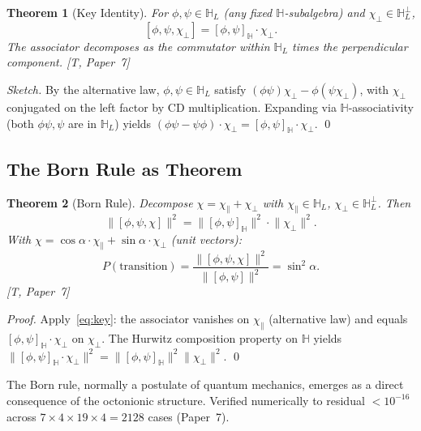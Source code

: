 \documentclass[11pt, a4paper]{article}
\newtheorem{theorem}{Theorem}
\newcommand{\Hq}{\mathbb{H}}
\newcommand{\norm}[1]{\lVert #1 \rVert}
\begin{document}
\begin{theorem}[Key Identity]
\label{thm:key_identity}
For $\phi, \psi \in \Hq_L$ (any fixed $\Hq$-subalgebra) and
$\chi_\perp \in \Hq_L^\perp$,
\begin{equation}
\boxed{\;[\phi, \psi, \chi_\perp] = [\phi, \psi]_\Hq \cdot \chi_\perp.\;}
\label{eq:key}
\end{equation}
The associator decomposes as the commutator within $\Hq_L$ times the
perpendicular component. [T, Paper~7]
\end{theorem}

\begin{proof}[Sketch]
By the alternative law, $\phi, \psi \in \Hq_L$ satisfy
$(\phi \psi) \chi_\perp - \phi(\psi \chi_\perp)$, with $\chi_\perp$
conjugated on the left factor by CD multiplication. Expanding via
$\Hq$-associativity (both $\phi\psi, \psi$ are in $\Hq_L$) yields
$(\phi\psi - \psi\phi) \cdot \chi_\perp = [\phi, \psi]_\Hq \cdot \chi_\perp$.
\qed
\end{proof}

\subsection{The Born Rule as Theorem}

\begin{theorem}[Born Rule]
\label{thm:born}
Decompose $\chi = \chi_\parallel + \chi_\perp$ with
$\chi_\parallel \in \Hq_L$, $\chi_\perp \in \Hq_L^\perp$. Then
\begin{equation}
\norm{[\phi, \psi, \chi]}^2 = \norm{[\phi, \psi]_\Hq}^2 \cdot \norm{\chi_\perp}^2.
\end{equation}
With $\chi = \cos\alpha \cdot \chi_\parallel + \sin\alpha \cdot \chi_\perp$
(unit vectors):
\begin{equation}
P(\text{transition}) = \frac{\norm{[\phi,\psi,\chi]}^2}{\norm{[\phi,\psi]}^2}
= \sin^2\alpha.
\end{equation}
[T, Paper~7]
\end{theorem}

\begin{proof}
Apply~\eqref{eq:key}: the associator vanishes on $\chi_\parallel$
(alternative law) and equals $[\phi,\psi]_\Hq \cdot \chi_\perp$ on
$\chi_\perp$. The Hurwitz composition property on $\Hq$ yields
$\norm{[\phi,\psi]_\Hq \cdot \chi_\perp}^2
= \norm{[\phi,\psi]_\Hq}^2 \norm{\chi_\perp}^2$. \qed
\end{proof}

The Born rule, normally a postulate of quantum mechanics, emerges as
a direct consequence of the octonionic structure. Verified
numerically to residual $< 10^{-16}$ across $7 \times 4 \times 19
\times 4 = 2128$ cases (Paper~7).
\end{document}
